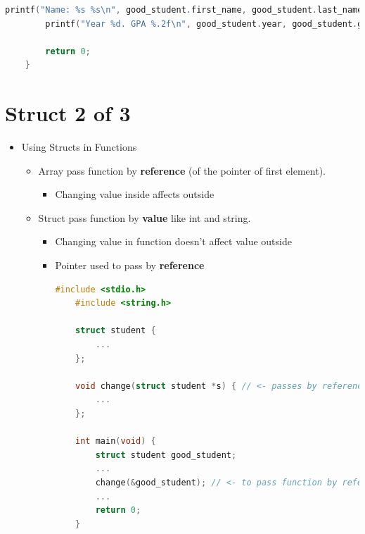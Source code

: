 \documentclass[12pt]{article}
\begin{document}
\begin{itemize}
\begin{lstlisting}[language=c,caption={struct\_example\_1.c}]
        printf("Name: %s %s\n", good_student.first_name, good_student.last_name);
        printf("Year %d. GPA %.2f\n", good_student.year, good_student.gpa);

        return 0;
    }
    \end{lstlisting}

\bigskip

\section*{Struct 2 of 3}

\bigskip

\begin{itemize}
    \item Using Structs in Functions
    \begin{itemize}
        \item Array pass function by \textbf{reference} (of the pointer of first element).
        \begin{itemize}
            \item Changing value inside affects outside
        \end{itemize}
        \item Struct pass function by \textbf{value} like int and string.

        \begin{itemize}
            \item Changing value in function doesn't affect value outside
            \item Pointer used to pass by \textbf{reference}

    \begin{lstlisting}[language=c,caption={struct\_example\_2.c}]
    #include <stdio.h>
    #include <string.h>

    struct student {
        ...
    };

    void change(struct student *s) { // <- passes by reference
        ...
    };

    int main(void) {
        struct student good_student;
        ...
        change(&good_student); // <- to pass function by reference (This is too cool!!!)
        ...
        return 0;
    }
    \end{lstlisting}
        \end{itemize}

    \end{itemize}
\end{itemize}

\end{itemize}
\end{document}
